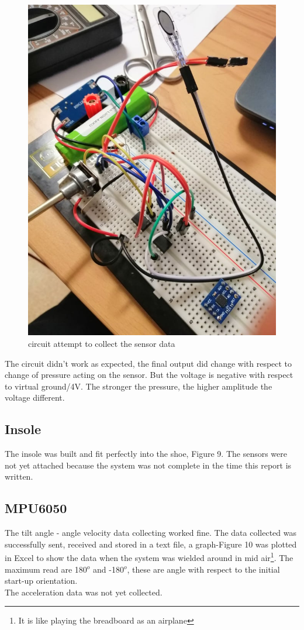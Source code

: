 \documentclass[12pt,a4paper]{article}
\begin{document}
\begin{figure}[hbt!]
\begin{center}
\includegraphics[width = 170mm]{test1.jpg}
\caption{circuit attempt to collect the sensor data}
\end{center}
\end{figure} 
The circuit didn't work as expected, the final output did change with respect to change of pressure acting on the sensor. But the voltage is negative with respect to virtual ground/4V. The stronger the pressure, the higher amplitude the voltage different.
\subsection{Insole}
The insole was built and fit perfectly into the shoe, Figure 9. The sensors were not yet attached because the system was not complete in the time this report is written.
\subsection{MPU6050}
The tilt angle - angle velocity data collecting worked fine. The data collected was successfully sent, received and stored in a text file, a graph-Figure 10 was plotted in Excel to show the data when the system was wielded around in mid air\footnote{It is like playing the breadboard as an airplane}. The maximum read are 180$^o$ and -180$^o$, these are angle with respect to the initial start-up orientation.\\
The acceleration data was not yet collected. 
\end{document}

